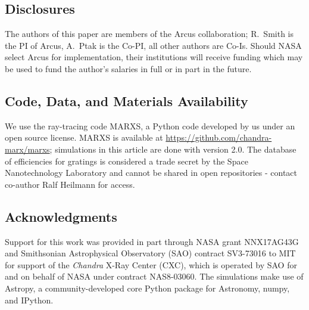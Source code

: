 \documentclass[12pt]{spieman}  %
\begin{document}
\begin{spacing}{2}
\subsection*{Disclosures}
The authors of this paper are members of the Arcus collaboration; R.~Smith is the PI of Arcus, A.~Ptak is the Co-PI, all other authors are Co-Is. Should NASA select Arcus for implementation, their institutions will receive funding which may be used to fund the author's salaries in full or in part in the future.


\subsection* {Code, Data, and Materials Availability}
We use the ray-tracing code MARXS\cite{2017AJ....154..243G,marxs2.0}, a Python code developed by us under an open source license. MARXS is available at \url{https://github.com/chandra-marx/marxs}; simulations in this article are done with version 2.0. The database of efficiencies for gratings is considered a trade secret by the Space Nanotechnology Laboratory and cannot be shared in open repositories - contact co-author Ralf Heilmann for access.




\subsection* {Acknowledgments}
Support
for this work was provided in part through NASA grant NNX17AG43G and
Smithsonian Astrophysical Observatory (SAO) contract SV3-73016 to MIT
for support of the {\em Chandra} X-Ray Center (CXC), which is operated
by SAO for and on behalf of NASA under contract NAS8-03060.  The
simulations make use of Astropy, a community-developed core Python
package for Astronomy\cite{astropy:2022}, numpy\cite{numpy}, and IPython\cite{IPython}.



\end{spacing}
\end{document}
